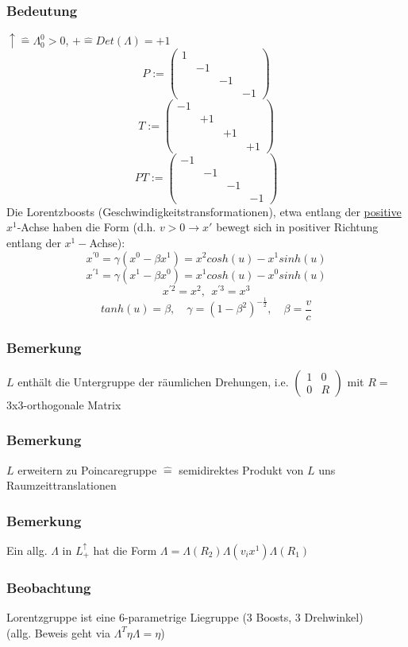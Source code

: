 \documentclass[twoside,a4paper]{scrartcl}
\renewcommand{\1}{\mathds{1}}
\newcommand{\ra}{\rightarrow}
\newcommand{\entspricht}{\mathrel{\widehat{=}}}
\renewcommand{\L}{\Lambda}
\begin{document}
\subsubsection*{Bedeutung}
$\uparrow \entspricht \L_0^0 >0$, $+\entspricht Det(\L)=+1$
$$P:= \begin{pmatrix}1 \\ & -1 \\ & & -1 \\ & & & -1\end{pmatrix}$$
$$T:= \begin{pmatrix}-1 \\ & +1 \\ & & +1 \\ & & & +1\end{pmatrix}$$
$$PT:= \begin{pmatrix}-1 \\ & -1 \\ & & -1 \\ & & & -1\end{pmatrix}$$
Die Lorentzboosts (Geschwindigkeitstransformationen), etwa entlang der \underline{positive} $x^1$-Achse haben die Form (d.h. $v>0 \ra x'$ bewegt sich in positiver Richtung entlang der $x^1-$Achse):
$$x^{'0}=\gamma(x^0-\beta x^1)=x^2 cosh(u)-x^1 sinh(u)$$
$$x^{'1}=\gamma(x^1-\beta x^0)=x^1 cosh(u)-x^0 sinh(u)$$
$$x^{'2}=x^2, \ \ x^{'3}=x^3$$
$$ tanh(u)=\beta, \quad \gamma=(1-\beta^2)^{-\frac{1}{2}}, \quad \beta=\frac{v}{c}$$
\subsubsection*{Bemerkung}
$L$ enthält die Untergruppe der räumlichen Drehungen, i.e. $\begin{pmatrix}1 & 0\\ 0 & R\end{pmatrix}$ mit $R=$3x3-orthogonale Matrix
\subsubsection*{Bemerkung}
$L$ erweitern zu Poincaregruppe $\entspricht$ semidirektes Produkt von $L$ uns Raumzeittranslationen
\subsubsection*{Bemerkung}
Ein allg. $\L$ in $L_+^\uparrow$ hat die Form $\L=\L(R_2)\L(v_ix^1)\L(R_1)$
\subsubsection*{Beobachtung}
Lorentzgruppe ist eine 6-parametrige Liegruppe (3 Boosts, 3 Drehwinkel)\\
(allg. Beweis geht via $\L^T \eta \L=\eta$)
\end{document}
